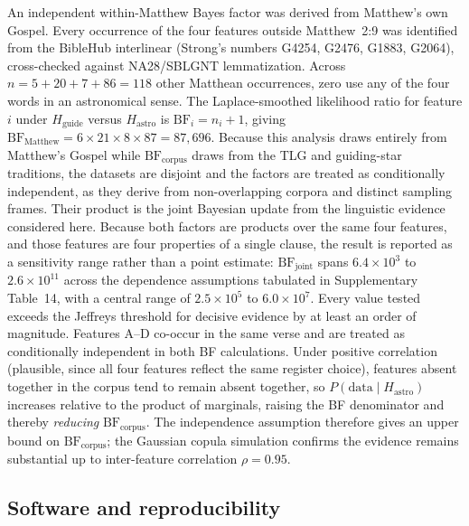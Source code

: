 \documentclass[sn-nature]{sn-jnl}
\begin{document}
An independent within-Matthew Bayes factor was derived from Matthew's own
Gospel. Every occurrence of the four features outside Matthew~2:9 was
identified from the BibleHub interlinear (Strong's numbers G4254, G2476,
G1883, G2064), cross-checked against NA28/SBLGNT lemmatization.
Across $n=5+20+7+86=118$ other Matthean occurrences, zero use any of the
four words in an astronomical sense. The Laplace-smoothed likelihood ratio
for feature $i$ under $H_\text{guide}$ versus $H_\text{astro}$ is
$\mathrm{BF}_i=n_i+1$, giving
$\mathrm{BF}_\text{Matthew}=6\times21\times8\times87=87{,}696$.
Because this analysis draws entirely from Matthew's Gospel while
$\mathrm{BF}_\text{corpus}$ draws from the TLG and guiding-star traditions,
the datasets are disjoint and the factors are treated as conditionally
independent, as they derive from non-overlapping corpora and distinct
sampling frames.
Their product is the joint Bayesian update from the linguistic evidence
considered here. Because both factors are products over the same four
features, and those features are four properties of a single clause, the
result is reported as a sensitivity range rather than a point estimate:
$\mathrm{BF}_\text{joint}$ spans $6.4\times10^{3}$ to $2.6\times10^{11}$
across the dependence assumptions tabulated in Supplementary
Table~14, with a central range of $2.5\times10^{5}$ to
$6.0\times10^{7}$. Every value tested exceeds the Jeffreys threshold for
decisive evidence by at least an order of magnitude.
Features A--D co-occur in the same verse and are treated as conditionally
independent in both BF calculations. Under positive correlation (plausible,
since all four features reflect the same register choice), features absent
together in the corpus tend to remain absent together, so
$P(\text{data}\mid H_\text{astro})$ increases relative to the product of
marginals, raising the BF denominator and thereby \emph{reducing}
$\mathrm{BF}_\text{corpus}$. The independence assumption therefore gives an
upper bound on $\mathrm{BF}_\text{corpus}$; the Gaussian copula simulation
confirms the evidence remains substantial up to inter-feature correlation
$\rho=0.95$.

\subsection{Software and reproducibility}
\end{document}
